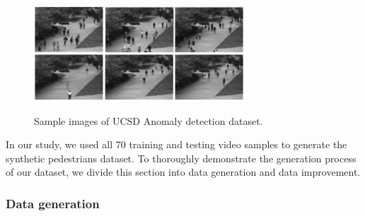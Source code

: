 \begin{figure}[H]
	\centering
	{\includegraphics[width=0.7\textwidth]{images/anomaly}}
	\caption{Sample images of UCSD Anomaly detection dataset.}
	\label{fig:anomaly}
\end{figure}


\indent In our study, we used all 70 training and testing video samples to generate the synthetic pedestrians dataset. To thoroughly demonstrate the generation process of our dataset, we divide this section into data generation and data improvement.

  
\subsubsection{Data generation}

